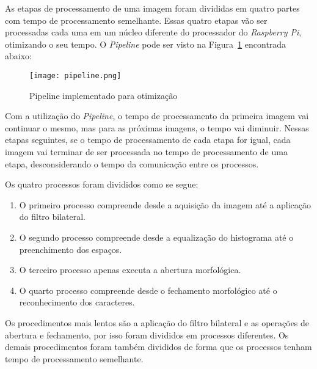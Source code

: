 As etapas de processamento de uma imagem foram divididas em quatro partes com
tempo de processamento semelhante. Essas quatro etapas vão ser processadas cada
uma em um núcleo diferente do processador do \emph{Raspberry Pi}, otimizando o
seu tempo. O \emph{Pipeline} pode ser visto na Figura~\ref{fig:pipeline}
encontrada abaixo:

\begin{figure}[H]
	\centering
	\texttt{[image: pipeline.png]}
	\caption{Pipeline implementado para otimização}
	\label{fig:pipeline}
\end{figure}

Com a utilização do \emph{Pipeline}, o tempo de processamento da primeira imagem
vai continuar o mesmo, mas para as próximas imagens, o tempo vai diminuir.
Nessas etapas seguintes, se o tempo de processamento de cada etapa for igual,
cada imagem vai terminar de ser processada no tempo de processamento de uma
etapa, desconsiderando o tempo da comunicação entre os processos.

Os quatro processos foram divididos como se segue:

\begin{enumerate}
	\item O primeiro processo compreende desde a aquisição da imagem até a aplicação do filtro bilateral.
	\item O segundo processo compreende desde a equalização do histograma até o preenchimento dos espaços.
	\item O terceiro processo apenas executa a abertura morfológica.
	\item O quarto processo compreende desde o fechamento morfológico até o reconhecimento dos caracteres.
\end{enumerate}

Os procedimentos mais lentos são a aplicação do filtro bilateral e as operações
de abertura e fechamento, por isso foram divididos em processos diferentes. Os
demais procedimentos foram também divididos de forma que os processos tenham
tempo de processamento semelhante.


